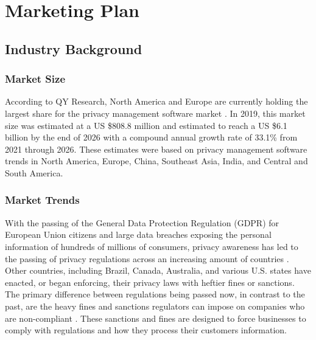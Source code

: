 {\let\cleardoublepage\relax \chapter{Marketing Plan}}



\section{Industry Background}

\subsection{Market Size} \label{market.size}

According to QY Research, North America and Europe are currently holding the largest share for the privacy management software market \cite{qy.2020}. In 2019, this market size was estimated at a US \$808.8 million and estimated to reach a US \$6.1 billion by the end of 2026 with a compound annual growth rate of 33.1\% from 2021 through 2026. These estimates were based on privacy management software trends in North America, Europe, China, Southeast Asia, India, and Central and South America.

\subsection{Market Trends} \label{marketing.trends}

With the passing of the General Data Protection Regulation (GDPR) for European Union citizens and large data breaches exposing the personal information of hundreds of millions of consumers, privacy awareness has led to the passing of privacy regulations across an increasing amount of countries \cite{privacypolicies.2019}. Other countries, including Brazil, Canada, Australia, and various U.S. states have enacted, or began enforcing, their privacy laws with heftier fines or sanctions. The primary difference between regulations being passed now, in contrast to the past, are the heavy fines and sanctions regulators can impose on companies who are non-compliant \cite{tr.2020}. These sanctions and fines are designed to force businesses to comply with regulations and how they process their customers information.

